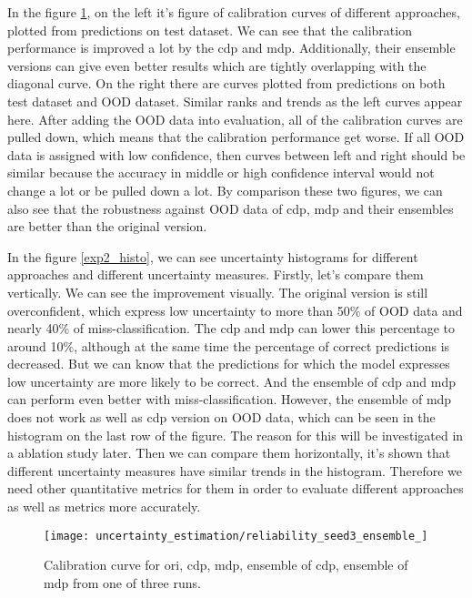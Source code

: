 In the figure \ref{exp2_reliability}, on the left it's figure of calibration curves of different approaches, plotted from predictions on test dataset. We can see that the calibration performance is improved a lot by the cdp and mdp. Additionally, their ensemble versions can give even better results which are tightly overlapping with the diagonal curve. On the right there are curves plotted from predictions on both test dataset and OOD dataset. Similar ranks and trends as the left curves appear here. After adding the OOD data into evaluation, all of the calibration curves are pulled down, which means that the calibration performance get worse. If all OOD data is assigned with low confidence, then curves between left and right should be similar because the accuracy in middle or high confidence interval would not change a lot or be pulled down a lot. By comparison these two figures, we can also see that the robustness against OOD data of cdp, mdp and their ensembles are better than the original version.

In the figure \ref{exp2_histo}, we can see uncertainty histograms for different approaches and different uncertainty measures. Firstly, let's compare them vertically. We can see the improvement visually. The original version is still overconfident, which express low uncertainty to more than 50$\%$ of OOD data and nearly 40\% of miss-classification. The  cdp and mdp can lower this percentage to around 10\%, although at the same time the percentage of correct predictions is decreased. But we can know that the predictions for which the model expresses low uncertainty are more likely to be correct. And the ensemble of cdp and mdp can perform even better with miss-classification. However, the ensemble of mdp does not work as well as cdp version on OOD data, which can be seen in the histogram on the last row of the figure. The reason for this will be investigated in a ablation study later. Then we can compare them horizontally, it's shown that different uncertainty measures have similar trends in the histogram. Therefore we need other quantitative metrics for them in order to evaluate different approaches as well as metrics more accurately.  

\begin{figure}[H]
	\begin{center}
		\texttt{[image: uncertainty\_estimation/reliability\_seed3\_ensemble\_]}
		\caption{Calibration curve for ori, cdp, mdp, ensemble of cdp, ensemble of mdp from one of three runs.}		
		\label{exp2_reliability}
	\end{center}
\end{figure}

